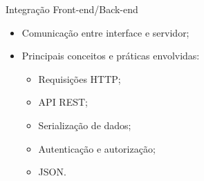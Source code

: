 \begin{frame}{Integração Front-end/Back-end}
    \begin{itemize}
        \item Comunicação entre interface e servidor; \vspace{0.5cm}
        \item Principais conceitos e práticas envolvidas: \vspace{0.5cm}
              \begin{itemize}
                  \item Requisições HTTP; \vspace{0.25cm}
                  \item API REST; \vspace{0.25cm}
                  \item Serialização de dados; \vspace{0.25cm}
                  \item Autenticação e autorização; \vspace{0.25cm}
                  \item JSON. \vspace{0.25cm}
              \end{itemize}
    \end{itemize}
\end{frame}
















